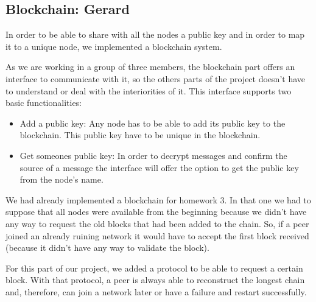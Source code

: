 \documentclass[12pt,a4paper,draft]{article}
\begin{document}
\subsection{Blockchain: Gerard}

In order to be able to share with all the nodes a public key and in order to map it to a unique node, we implemented a blockchain system.

As we are working in a group of three members, the blockchain part offers an interface to communicate with it, so the others parts of the project doesn't have to understand or deal with the interiorities of it.
This interface supports two basic functionalities:

\begin{itemize}
 \item Add a public key: Any node has to be able to add its public key to the blockchain. This public key have to be unique in the blockchain.
 \item Get someones public key: In order to decrypt messages and confirm the source of a message the interface will offer the option to get the public key from the node's name.
\end{itemize}

We had already implemented a blockchain for homework 3.
In that one we had to suppose that all nodes were available from the beginning because we didn't have any way to request the old blocks that had been added to the chain.
So, if a peer joined an already ruining network it would have to accept the first block received (because it didn't have any way to validate the block).

For this part of our project, we added a protocol to be able to request a certain block.
With that protocol, a peer is always able to reconstruct the longest chain and, therefore, can join a network later or have a failure and restart successfully.
\end{document}
